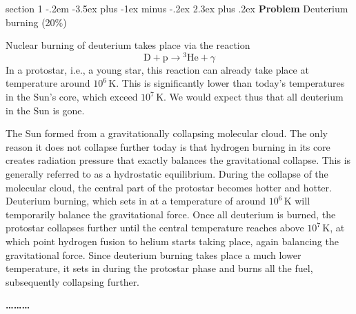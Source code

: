 \documentclass[letterpaper,12pt,twoside=false,DIV=13]{scrartcl}
\makeatletter
\newenvironment{problem}{\@startsection
    {section}
    {1}
    {-.2em}
    {-3.5ex plus -1ex minus -.2ex}
    {2.3ex plus .2ex}
    {
        \pagebreak[3] %
        \noindent\sffamily\bfseries Problem
    }
}
{
    \begin{center}\large\bfseries\ldots\ldots\ldots\end{center}
}
\makeatother
\begin{document}
\begin{problem}{Deuterium burning (20\%)}

Nuclear burning of deuterium takes place via the reaction
\begin{equation}
    \mathrm{D} + \mathrm{p} \longrightarrow {^{3}\mathrm{He}} + \gamma
\end{equation}
In a protostar, i.e., a young star, this reaction can already take place at temperature around $10^6$\,K. This is significantly lower than today's temperatures in the Sun's core, which exceed $10^7$\,K. We would expect thus that all deuterium in the Sun is gone.

The Sun formed from a gravitationally collapsing molecular cloud. The only reason it does not collapse further today is that hydrogen burning in its core creates radiation pressure that exactly balances the gravitational collapse. This is generally referred to as a hydrostatic equilibrium. During the collapse of the molecular cloud, the central part of the protostar becomes hotter and hotter. Deuterium burning, which sets in at a temperature of around $10^6$\,K will temporarily balance the gravitational force. Once all deuterium is burned, the protostar collapses further until the central temperature reaches above $10^7$\,K, at which point hydrogen fusion to helium starts taking place, again balancing the gravitational force. Since deuterium burning takes place a much lower temperature, it sets in during the protostar phase and burns all the fuel, subsequently collapsing further.

\end{problem}
\end{document}

